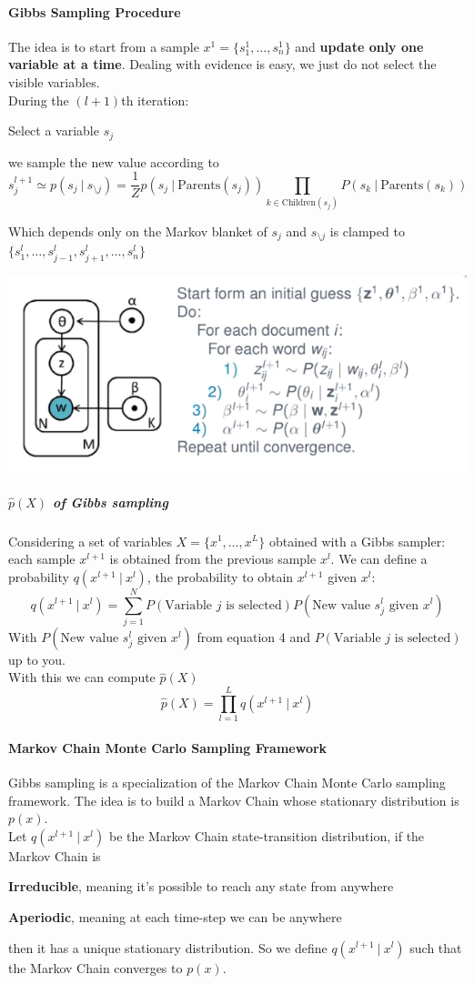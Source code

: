 \documentclass[10pt]{report}
\begin{document}
\paragraph{Gibbs Sampling Procedure}
The idea is to start from a sample $x^1=\{s_1^1,\ldots,s_n^1\}$ and \textbf{update only one variable at a time}. Dealing with evidence is easy, we just do not select the visible variables.\\
During the $(l+1)$th iteration:
\begin{list}{}{}
	\item Select a variable $s_j$
	\item we sample the new value according to $$s_j^{l+1}\simeq p(s_j\:|\:s_{\setminus j}) = \frac{1}{Z}p(s_j\:|\:\text{Parents}(s_j))\prod_{k\in\text{Children}(s_j)} P(s_k\:|\:\text{Parents}(s_k)) $$
\end{list}
Which depends only on the Markov blanket of $s_j$ and $s_{\setminus j}$ is clamped to$ \{s_1^l,\ldots,s_{j-1}^l,s_{j+1}^l,\ldots,s_n^l\}$
\begin{center}
	\includegraphics[scale=0.5]{45.png}
\end{center}
\subparagraph{$\hat{p}(X)$ of Gibbs sampling} Considering a set of variables $X=\{x^1,\ldots,x^L\}$ obtained with a Gibbs sampler: each sample $x^{l+1}$ is obtained from the previous sample $x^l$. We can define a probability $q(x^{l+1}\:|\:x^l)$, the probability to obtain $x^{l+1}$ given $x^l$:
$$q(x^{l+1}\:|\:x^l) = \sum_{j=1}^NP(\text{Variable }j\text{ is selected})P(\text{New value }s_j^l\text{ given }x^l)$$
With $P(\text{New value }s_j^l\text{ given }x^l)$ from equation 4 and $P(\text{Variable }j\text{ is selected})$ up to you.\\
With this we can compute $\hat{p}(X)$ $$\hat{p}(X)=\prod_{l=1}^L q(x^{l+1}\:|\:x^l)$$
\paragraph{Markov Chain Monte Carlo Sampling Framework} Gibbs sampling is a specialization of the Markov Chain Monte Carlo sampling framework. The idea is to build a Markov Chain whose stationary distribution is $p(x)$.\\
Let $q(x^{l+1}\:|\:x^l)$ be the Markov Chain state-transition distribution, if the Markov Chain is\begin{list}{}{}
	\item \textbf{Irreducible}, meaning it's possible to reach any state from anywhere
	\item \textbf{Aperiodic}, meaning at each time-step we can be anywhere
\end{list}
then it has a unique stationary distribution. So we define $q(x^{l+1}\:|\:x^l)$ such that the Markov Chain converges to $p(x)$.
\end{document}
